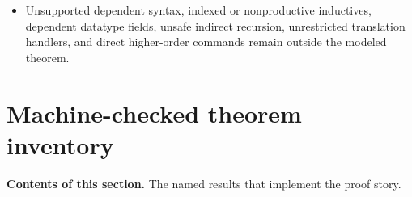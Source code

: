 \documentclass[11pt]{article}
\theoremstyle{remark}
\newcommand{\sectioncontents}[1]{%
  \smallskip\noindent\textbf{Contents of this section.} #1\par\medskip}
\begin{document}
\begin{itemize}[leftmargin=*]
       semantics. The current whole-pipeline representation does not yet prove
       the SMT array/select model construction or include this definition in
       its certified derived-command segment. Consequently the final exact
       command-set comparison rejects an array-bearing script rather than
       applying the reflection theorem to it.
 \item Unsupported dependent syntax, indexed or nonproductive inductives,
       dependent datatype fields, unsafe indirect recursion,
       unrestricted translation handlers, and direct higher-order commands
       remain outside the modeled theorem.
\end{itemize}

\section{Machine-checked theorem inventory}
\sectioncontents{The named results that implement the proof story.}
\end{document}
